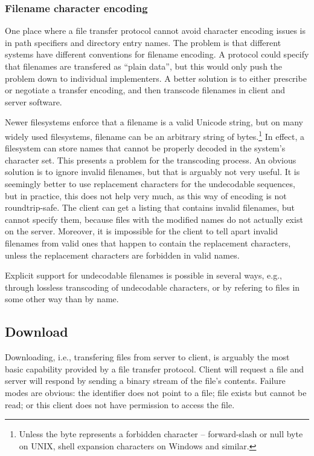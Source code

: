\subsubsection{Filename character encoding}

One place where a file transfer protocol cannot avoid character encoding issues is in path specifiers and
directory entry names. The problem is that different systems have different conventions for filename encoding.
A protocol could specify that filenames are transfered as ``plain data'', but this would only push the problem
down to individual implementers. A better solution is to either prescribe or negotiate a transfer encoding,
and then transcode filenames in client and server software.

Newer filesystems enforce that a filename is a valid Unicode string, but on many widely used filesystems,
filename can be an arbitrary string of bytes.\footnote{Unless the byte represents a forbidden character --
forward-slash or null byte on UNIX, shell expansion characters on Windows and similar.} In effect,
a filesystem can store names that cannot be properly decoded in the system's character set. This presents
a problem for the transcoding process.  An obvious solution is to ignore invalid filenames, but that is
arguably not very useful. It is seemingly better to use replacement characters for the undecodable sequences,
but in practice, this does not help very much, as this way of encoding is not roundtrip-safe. The client can
get a listing that contains invalid filenames, but cannot specify them, because files with the modified names
do not actually exist on the server. Moreover, it is impossible for the client to tell apart invalid filenames
from valid ones that happen to contain the replacement characters, unless the replacement characters are
forbidden in valid names.

Explicit support for undecodable filenames is possible in several ways, e.g., through lossless transcoding of
undecodable characters, or by refering to files in some other way than by name.


\subsection{Download}

Downloading, i.e., transfering files from server to client, is arguably the most basic capability provided by
a file transfer protocol. Client will request a file and server will respond by sending a binary stream of the
file's contents. Failure modes are obvious: the identifier does not point to a file; file exists but cannot be
read; or this client does not have permission to access the file.

